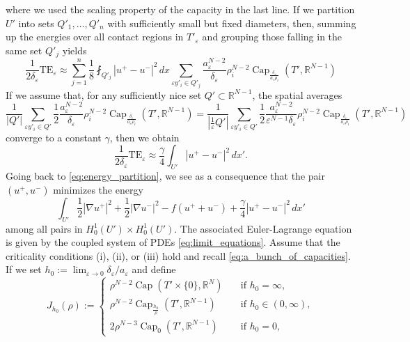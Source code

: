 \documentclass{article}
\numberwithin{equation}{section}
\theoremstyle{definition}
\theoremstyle{remark}
\newcommand{\cpct}{\operatorname{Cap}}
\begin{document}
where we used the scaling property of the capacity in the last line. If we partition $U'$ into sets $Q'_1, \dots, Q'_n$ with sufficiently small but fixed diameters, then, summing up the energies over all contact regions in $T'_\varepsilon$ and grouping those falling in the same set $Q'_j$ yields
\begin{equation}
    \frac{1}{2\delta_\varepsilon} \mathrm{TE}_\varepsilon \approx \sum_{j = 1}^n \frac{1}{8} \fint_{Q'_j} |u^+ - u^-|^2 \, dx \sum_{\varepsilon y'_i \in Q'_j} \frac{a_\varepsilon^{N - 2}}{\delta_\varepsilon} \rho_i^{N - 2} \cpct_{\frac{\delta_\varepsilon}{a_\varepsilon \rho_i}}(T', \mathbb{R}^{N - 1})
\end{equation}
If we assume that, for any sufficiently nice set $Q' \subset \mathbb{R}^{N - 1}$, the spatial averages
\begin{equation} \label{eq:spatial_average_intro}
    \frac{1}{|Q'|}\sum_{\varepsilon y'_i \in Q'} \frac{1}{2} \frac{a_\varepsilon^{N - 2}}{\delta_\varepsilon} \rho_i^{N - 2} \cpct_{\frac{\delta_\varepsilon}{a_\varepsilon \rho_i}}(T', \mathbb{R}^{N - 1}) = \frac{1}{\left|\frac{1}{\varepsilon} Q'\right|} \sum_{\varepsilon y'_i \in Q'} \frac{1}{2}\frac{a_\varepsilon^{N - 2}}{\varepsilon^{N - 1} \delta_\varepsilon} \rho_i^{N - 2} \cpct_{\frac{\delta_\varepsilon}{a_\varepsilon \rho_i}}(T', \mathbb{R}^{N - 1})
\end{equation}
converge to a constant $\gamma$, then we obtain
\[
\frac{1}{2\delta_\varepsilon} \mathrm{TE}_\varepsilon \approx \frac{\gamma}{4}\int_{U' } |u^+ - u^-|^2 \, dx'.
\]
Going back to \eqref{eq:energy_partition}, we see as a consequence that the pair $(u^+, u^-)$ minimizes the energy
\[
\int_{U'} \frac{1}{2} |\nabla u^+|^2 + \frac{1}{2} |\nabla u^-|^2 - f(u^+ + u^-) + \frac{\gamma}{4}|u^+ - u^-|^2 \, dx'
\]
among all pairs in $H_0^1(U') \times H_0^1(U')$. The associated Euler-Lagrange equation is given by the coupled system of PDEs \eqref{eq:limit_equations}. Assume that the criticality conditions (i), (ii), or (iii) hold and recall \eqref{eq:a_bunch_of_capacities}. If we set $h_0 := \lim_{\varepsilon \to 0} \delta_\varepsilon/a_\varepsilon$ and define
\begin{equation*}
    J_{h_0}(\rho) :=
    \begin{cases}
        \rho^{N - 2} \cpct(T' \times \{0\}, \mathbb{R}^N) \quad &\text{if } h_0 = \infty, \\
        \rho^{N - 2} \cpct_\frac{h_0}{\rho}(T', \mathbb{R}^{N - 1}) \quad &\text{if } h_0 \in (0, \infty), \\
        2 \rho^{N - 3} \cpct_0(T', \mathbb{R}^{N - 1}) \quad &\text{if } h_0 = 0,
    \end{cases}
\end{equation*}
\end{document}
